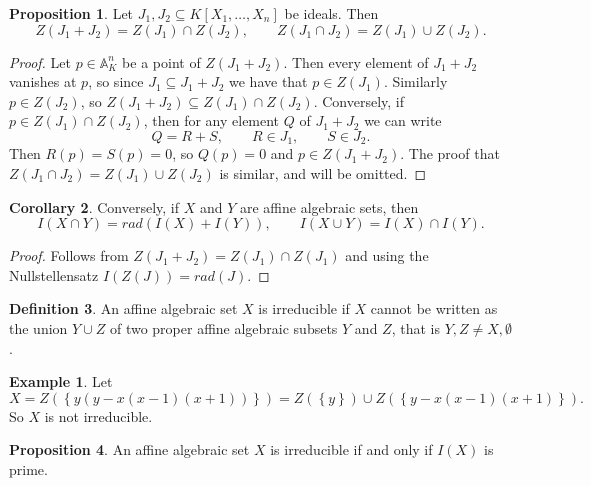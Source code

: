 \documentclass{article}
\newcommand{\A}{\mathbb{A}}
\newcommand{\rb}[1]{\left( #1 \right)}
\renewcommand{\sb}[1]{\left[ #1 \right]}
\newcommand{\cb}[1]{\left\{ #1 \right\}}
\theoremstyle{definition}\newtheorem{definition}{Definition}[subsection]
\theoremstyle{definition}\newtheorem{remark}[definition]{Remark}
\theoremstyle{definition}\newtheorem*{example}{Example}
\theoremstyle{definition}\newtheorem*{note}{Note}
\newtheorem{proposition}[definition]{Proposition}
\newtheorem{corollary}[definition]{Corollary}
\begin{document}
\begin{proposition}
Let $ J_1, J_2 \subseteq K\sb{X_1, \dots, X_n} $ be ideals. Then
$$ Z\rb{J_1 + J_2} = Z\rb{J_1} \cap Z\rb{J_2}, \qquad Z\rb{J_1 \cap J_2} = Z\rb{J_1} \cup Z\rb{J_2}. $$
\end{proposition}

\begin{proof}
Let $ p \in \A_K^n $ be a point of $ Z\rb{J_1 + J_2} $. Then every element of $ J_1 + J_2 $ vanishes at $ p $, so since $ J_1 \subseteq J_1 + J_2 $ we have that $ p \in Z\rb{J_1} $. Similarly $ p \in Z\rb{J_2} $, so $ Z\rb{J_1 + J_2} \subseteq Z\rb{J_1} \cap Z\rb{J_2} $. Conversely, if $ p \in Z\rb{J_1} \cap Z\rb{J_2} $, then for any element $ Q $ of $ J_1 + J_2 $ we can write
$$ Q = R + S, \qquad R \in J_1, \qquad S \in J_2. $$
Then $ R\rb{p} = S\rb{p} = 0 $, so $ Q\rb{p} = 0 $ and $ p \in Z\rb{J_1 + J_2} $. The proof that $ Z\rb{J_1 \cap J_2} = Z\rb{J_1} \cup Z\rb{J_2} $ is similar, and will be omitted.
\end{proof}

\begin{corollary}
Conversely, if $ X $ and $ Y $ are affine algebraic sets, then
$$ I\rb{X \cap Y} = rad\rb{I\rb{X} + I\rb{Y}}, \qquad I\rb{X \cup Y} = I\rb{X} \cap I\rb{Y}. $$
\end{corollary}

\begin{proof}
Follows from $ Z\rb{J_1 + J_2} = Z\rb{J_1} \cap Z\rb{J_1} $ and using the Nullstellensatz $ I\rb{Z\rb{J}} = rad\rb{J} $.
\end{proof}

\begin{definition}
An affine algebraic set $ X $ is irreducible if $ X $ cannot be written as the union $ Y \cup Z $ of two proper affine algebraic subsets $ Y $ and $ Z $, that is $ Y, Z \ne X, \emptyset $.
\end{definition}

\begin{example}
Let
$$ X = Z\rb{\cb{y\rb{y - x\rb{x - 1}\rb{x + 1}}}} = Z\rb{\cb{y}} \cup Z\rb{\cb{y - x\rb{x - 1}\rb{x + 1}}}. $$
So $ X $ is not irreducible.
\end{example}

\begin{proposition}
An affine algebraic set $ X $ is irreducible if and only if $ I\rb{X} $ is prime.
\end{proposition}
\end{document}
